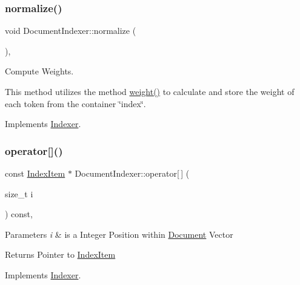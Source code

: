 \subsubsection{\texorpdfstring{normalize()}{normalize()}}
{\footnotesize\ttfamily void Document\+Indexer\+::normalize (\begin{DoxyParamCaption}{ }\end{DoxyParamCaption})\hspace{0.3cm}{\ttfamily [override]}, {\ttfamily [virtual]}}



Compute Weights. 

This method utilizes the method \hyperlink{class_document_indexer_aa637e8bce87c52d0d78bfebe8af02f13}{weight()} to calculate and store the weight of each token from the container \char`\"{}index\char`\"{}. 

Implements \hyperlink{class_indexer_a84f50c7bac96cd5a8daa18899a39bb5d}{Indexer}.

\mbox{\label{class_document_indexer_a68178124d9e7e30a60725483300a73ee}} 
\subsubsection{\texorpdfstring{operator[]()}{operator[]()}}
{\footnotesize\ttfamily const \hyperlink{class_index_item}{Index\+Item} $\ast$ Document\+Indexer\+::operator\mbox{[}$\,$\mbox{]} (\begin{DoxyParamCaption}\item[{size\+\_\+t}]{i }\end{DoxyParamCaption}) const\hspace{0.3cm}{\ttfamily [override]}, {\ttfamily [virtual]}}


\begin{DoxyParams}{Parameters}
{\em i} & is a Integer Position within \hyperlink{class_document}{Document} Vector \\
\hline
\end{DoxyParams}
\begin{DoxyReturn}{Returns}
Pointer to \hyperlink{class_index_item}{Index\+Item} 
\end{DoxyReturn}


Implements \hyperlink{class_indexer}{Indexer}.

\mbox{\label{class_document_indexer_af14be24c72be4b3eb165da9c504ec7d1}} 
